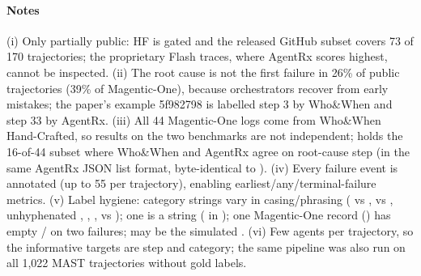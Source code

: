 \paragraph{Notes} (i) Only partially public: HF is gated and the released GitHub subset covers 73 of 170 trajectories; the proprietary Flash traces, where AgentRx scores highest, cannot be inspected. (ii) The root cause is not the first failure in 26\% of public trajectories (39\% of Magentic-One), because orchestrators recover from early mistakes; the paper's example 5f982798 is labelled step 3 by Who\&When and step 33 by AgentRx. (iii) All 44 Magentic-One logs come from Who\&When Hand-Crafted, so results on the two benchmarks are not independent;  holds the 16-of-44 subset where Who\&When and AgentRx agree on root-cause step (in the same AgentRx JSON list format, byte-identical to ). (iv) Every failure event is annotated (up to 55 per trajectory), enabling earliest/any/terminal-failure metrics. (v) Label hygiene: category strings vary in casing/phrasing ( vs ,  vs , unhyphenated , , ,  vs ); one  is a string ( in ); one Magentic-One record () has empty / on two failures;  may be the simulated . (vi) Few agents per trajectory, so the informative targets are step and category; the same pipeline was also run on all 1,022 MAST trajectories without gold labels.
